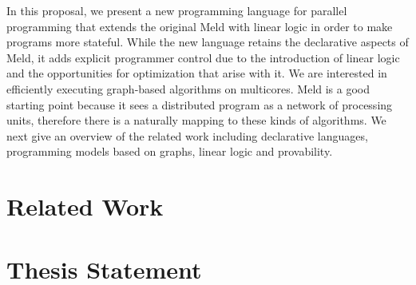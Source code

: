 In this proposal, we present a new programming language for parallel programming that extends the
original Meld with linear logic in order to make programs more stateful. While the new language retains
the declarative aspects of Meld, it adds explicit programmer control
due to the introduction of linear logic and the opportunities for optimization that arise with it.
We are interested in efficiently executing graph-based algorithms on multicores. Meld is a good
starting point because it sees a distributed program as a network of processing units, therefore
there is a naturally mapping to these kinds of algorithms.
We next give an overview of the related work including declarative languages, programming models
based on graphs, linear logic and provability.

\section{Related Work}



\section{Thesis Statement}



